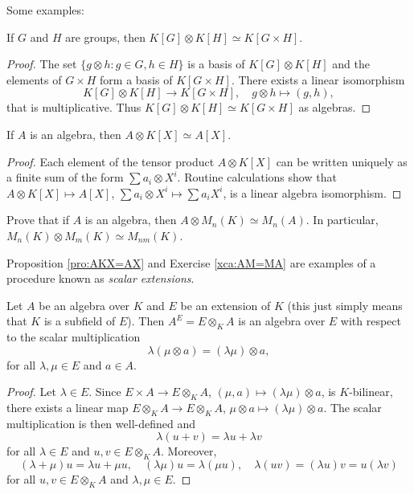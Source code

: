 Some examples:

\begin{proposition}
	If $G$ and $H$ are groups, then $K[G]\otimes K[H]\simeq K[G\times H]$.
\end{proposition}

\begin{proof}
	The set $\{g\otimes h:g\in G,h\in H\}$ is a basis of $K[G]\otimes K[H]$ and 
	the elements of $G\times H$ form a basis of $K[G\times H]$. There exists a linear isomorphism 
	\[
	K[G]\otimes K[H]\to K[G\times H], 
	\quad 
	g\otimes h\mapsto (g,h),
	\]
	that is multiplicative. Thus $K[G]\otimes K[H]\simeq K[G\times H]$
	as algebras. 
\end{proof}

\begin{proposition}
\label{pro:AKX=AX}
	If $A$ is an algebra, then $A\otimes K[X]\simeq A[X]$.	
\end{proposition}

\begin{proof}
	Each element of the tensor product $A\otimes K[X]$ can be written uniquely as a finite sum of
	the form $\sum a_i\otimes X^i$. Routine calculations show that 
	$A\otimes K[X]\mapsto A[X]$, $\sum a_i\otimes X^i\mapsto \sum a_iX^i$, is a 
	linear algebra isomorphism. 
\end{proof}

\begin{exercise}
\label{xca:AM=MA}
	Prove that if $A$ is an algebra, then $A\otimes M_n(K)\simeq M_n(A)$. In
	particular, $M_n(K)\otimes M_m(K)\simeq M_{nm}(K)$.
\end{exercise}

Proposition \ref{pro:AKX=AX} and Exercise \ref{xca:AM=MA} 
are examples of a procedure known as \emph{scalar extensions}. 

\begin{theorem}
\label{thm:extensions_scalars}
	Let $A$ be an algebra over $K$ and $E$ be an extension of $K$ (this just simply means that
	$K$ is a subfield of $E$). Then 
	$A^E=E\otimes_KA$ is an algebra over $E$ with respect to
	the scalar multiplication 
	\[
		\lambda(\mu\otimes a)=(\lambda\mu)\otimes a,
	\]
	for all $\lambda,\mu\in E$ and $a\in A$.
\end{theorem}

\begin{proof}
	Let $\lambda\in E$. Since $E\times A\to E\otimes_KA$,
	$(\mu,a)\mapsto (\lambda\mu)\otimes a$, is $K$-bilinear, there exists 
	a linear map $E\otimes_KA\to E\otimes_KA$, $\mu\otimes a\mapsto
	(\lambda\mu)\otimes a$. The scalar multiplication is then well-defined and 
	\[
	\lambda(u+v)=\lambda u+\lambda v
	\]
	for all $\lambda\in E$ and $u,v\in E\otimes_KA$. Moreover, 
	\[
	(\lambda+\mu)u=\lambda u+\mu u,
	\quad
	(\lambda\mu)u=\lambda(\mu u),
	\quad
	\lambda(uv)=(\lambda u)v=u(\lambda v)
	\]
	for all $u,v\in E\otimes_KA$ and $\lambda,\mu\in E$.
\end{proof}

